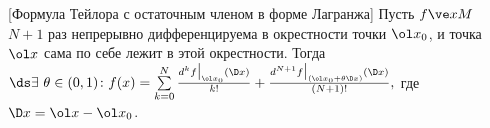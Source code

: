 [Формула Тейлора с остаточным членом в форме Лагранжа]\label{Tailor}
	 Пусть $f\ve xM$ $N+1$ раз непрерывно дифференцируема в окрестности точки $\ol x_0$,
	 и точка $\ol x$ сама по себе лежит в этой окрестности.
	 Тогда \(\ds\exists\ \theta\in(0,1)\colon f(x) = \sum\limits_{k=0}^N\frac{d^kf\big|_{\ol x_0}(\D x)}{k!} + \frac{d^{N+1}f\big|_{(\ol x_0 + \theta\D x)}(\D x)}{(N+1)!},\)
	 где $\D x = \ol x - \ol x_0$.
	 